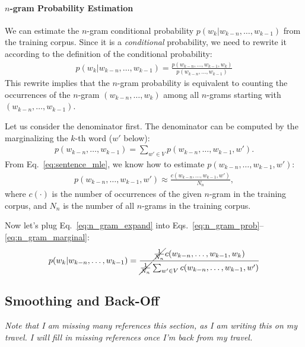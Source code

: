 \documentclass{report}
\begin{document}
\paragraph{$n$-gram Probability Estimation}

We can estimate the $n$-gram conditional probability $p(w_k | w_{k-n}, \ldots,
w_{k-1})$ from the training corpus.
Since it is a
{\em conditional} probability, we need to rewrite it according to the definition
of the conditional probability:
\begin{align}
    \label{eq:n_gram_prob}
    p(w_k | w_{k-n}, \ldots, w_{k-1}) = \frac{p(
    w_{k-n}, \ldots, w_{k-1}, w_k)}
    {p(w_{k-n}, \ldots, w_{k-1})}
\end{align}
This rewrite implies that the $n$-gram probability is equivalent to counting
the occurrences of the $n$-gram $(w_{k-n}, \ldots, w_{k})$
among all $n$-grams starting with $(w_{k-n}, \ldots, w_{k-1})$.

Let us consider the denominator first. The denominator can be computed by the
marginalizing the $k$-th word ($w'$ below):
\begin{align}
    \label{eq:n_gram_marginal}
    p(w_{k-n}, \ldots, w_{k-1}) = \sum_{w'\in V} p(w_{k-n}, \ldots, w_{k-1}, w').
\end{align}
From Eq.~\eqref{eq:sentence_mle}, we know how to estimate $p(w_{k-n}, \ldots,
w_{k-1}, w')$:
\begin{align}
    \label{eq:n_gram_expand}
    p(w_{k-n}, \ldots, w_{k-1}, w') \approx \frac{c(w_{k-n}, \ldots, w_{k-1},
    w')}{N_n},
\end{align}
where $c(\cdot)$ is the number of occurrences of the given $n$-gram in the
training corpus, and $N_n$ is the number of all $n$-grams in the training
corpus.

Now let's plug Eq.~\eqref{eq:n_gram_expand} into
Eqs.~\eqref{eq:n_gram_prob}--\eqref{eq:n_gram_marginal}:
\begin{align}
    \label{eq:n_gram_mle}
    p(w_k | w_{k-n}, \ldots, w_{k-1}) = \frac{
        \cancel{\frac{1}{N_n}}
        c(w_{k-n}, \ldots, w_{k-1}, w_k)}
    {
        \cancel{\frac{1}{N_n}} \sum_{w' \in V} c(w_{k-n}, \ldots, w_{k-1},
    w')
}
\end{align}

\subsection{Smoothing and Back-Off}

{\em Note that I am missing many references this section, as I am writing this
    on my travel. I will fill in missing references once I'm back from my
travel.}
\end{document}
